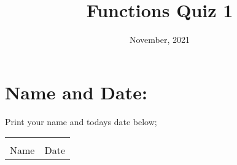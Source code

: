 \documentclass[12pt]{article} %
\title{Functions Quiz 1}
\date{November, 2021}
\begin{document}
    \renewcommand*{\coursecode}{MCR3U Quiz} %
    \renewcommand*{\assgnnumber}{1} %
    \renewcommand*{\submdate}{November, 2021} %
    \renewcommand*{\studentfname}{\textbf{Name:}} %
    \renewcommand*{\studentlname}{} %

    \renewcommand\qedsymbol{$\blacksquare$}
    \setfigpath
    \pagestyle{crowdmark}
    \fancyhfoffset[L,O]{0pt} %




	\maketitle
\section{Name and Date:}
	Print your name and todays date below;\\


	\begin{center}
	\noindent\begin{tabular}{ll}
		\makebox[3in]{\hrulefill} & \makebox[3in]{\hrulefill}\\
		Name & Date\\[8ex]%
	\end{tabular}
	\end{center}
	\newpage
\end{document}
